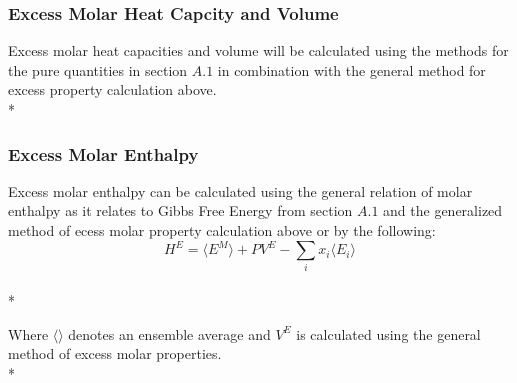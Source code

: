 \documentclass[a4paper,12pt]{article}
\begin{document}
\subsubsection{Excess Molar Heat Capcity and Volume}
\noindent Excess molar heat capacities and volume will be calculated using the  methods for the pure quantities in section $A.1$ in combination with the general method for excess property calculation above.\\*

\subsubsection{Excess Molar Enthalpy}
\noindent Excess molar enthalpy can be calculated using the general relation of molar enthalpy as it relates to Gibbs Free Energy from section $A.1$ and the generalized method of ecess molar property calculation above or by the following\cite{hexc}:
\begin{equation}H^E = \langle E^M \rangle + P V^E - \sum_{i} x_i \langle E_i \rangle\end{equation}\\*

\noindent Where $\langle \rangle$ denotes an ensemble average and $V^E$ is calculated using the general method of excess molar properties.\\* 




\end{document}
